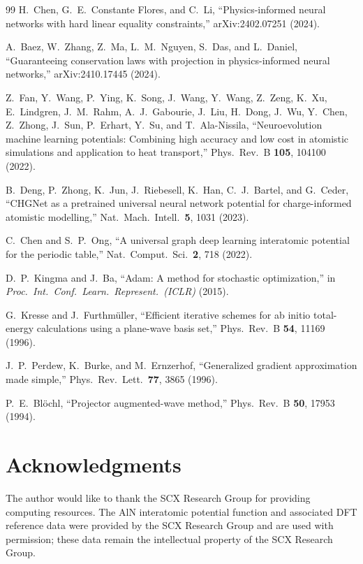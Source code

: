 \documentclass[twoside,prb,aps,floatfix,superscriptaddress,longbibliography]{revtex4-2}
\begin{document}
\begin{thebibliography}{99}
H.~Chen, G.~E.~Constante Flores, and C.~Li, ``Physics-informed neural networks with hard linear equality constraints,'' arXiv:2402.07251 (2024).

A.~Baez, W.~Zhang, Z.~Ma, L.~M.~Nguyen, S.~Das, and L.~Daniel, ``Guaranteeing conservation laws with projection in physics-informed neural networks,'' arXiv:2410.17445 (2024).

Z.~Fan, Y.~Wang, P.~Ying, K.~Song, J.~Wang, Y.~Wang, Z.~Zeng, K.~Xu, E.~Lindgren, J.~M.~Rahm, A.~J.~Gabourie, J.~Liu, H.~Dong, J.~Wu, Y.~Chen, Z.~Zhong, J.~Sun, P.~Erhart, Y.~Su, and T.~Ala-Nissila, ``Neuroevolution machine learning potentials: Combining high accuracy and low cost in atomistic simulations and application to heat transport,'' Phys.\ Rev.\ B \textbf{105}, 104100 (2022).

B.~Deng, P.~Zhong, K.~Jun, J.~Riebesell, K.~Han, C.~J.~Bartel, and G.~Ceder, ``CHGNet as a pretrained universal neural network potential for charge-informed atomistic modelling,'' Nat.\ Mach.\ Intell.\ \textbf{5}, 1031 (2023).

C.~Chen and S.~P.~Ong, ``A universal graph deep learning interatomic potential for the periodic table,'' Nat.\ Comput.\ Sci.\ \textbf{2}, 718 (2022).

D.~P.~Kingma and J.~Ba, ``Adam: A method for stochastic optimization,'' in \textit{Proc.\ Int.\ Conf.\ Learn.\ Represent.\ (ICLR)} (2015).

G.~Kresse and J.~Furthm\"{u}ller, ``Efficient iterative schemes for ab initio total-energy calculations using a plane-wave basis set,'' Phys.\ Rev.\ B \textbf{54}, 11169 (1996).

J.~P.~Perdew, K.~Burke, and M.~Ernzerhof, ``Generalized gradient approximation made simple,'' Phys.\ Rev.\ Lett.\ \textbf{77}, 3865 (1996).

P.~E.~Bl\"{o}chl, ``Projector augmented-wave method,'' Phys.\ Rev.\ B \textbf{50}, 17953 (1994).

\end{thebibliography}

\section*{Acknowledgments}
The author would like to thank the SCX Research Group for providing computing resources. The AlN interatomic potential function and associated DFT reference data were provided by the SCX Research Group and are used with permission; these data remain the intellectual property of the SCX Research Group.
\end{document}
